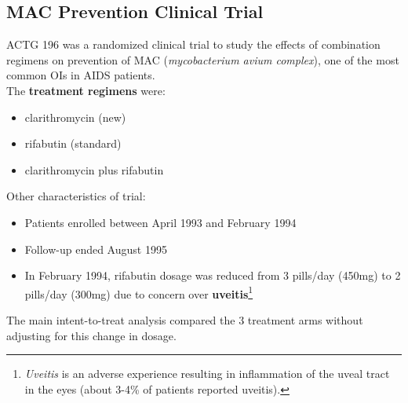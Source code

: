 \documentclass[11pt,slidesonly,semrot,portrait,palatino]{book}
\begin{document}
\subsection{MAC Prevention Clinical Trial}
ACTG 196 was a randomized clinical trial to study the effects of
combination regimens on prevention of MAC ({\em mycobacterium avium
complex}), one of the most common OIs in AIDS patients.\\[2ex]
\noindent
The {\bf treatment regimens} were:
\begin{itemize}
\item clarithromycin (new)
\item rifabutin (standard)
\item clarithromycin plus rifabutin
\end{itemize}
Other characteristics of trial:
\begin{itemize}
\item Patients enrolled between April 1993 and February 1994
\item Follow-up ended August 1995
\item In February 1994, rifabutin dosage was reduced from 3 pills/day
(450mg) to 2 pills/day (300mg) due to concern over {\bf uveitis}\footnote{\footnotesize
{\em Uveitis} is an adverse experience resulting in inflammation
of the uveal tract in the eyes (about 3-4\% of patients
reported uveitis).}
\end{itemize}
\noindent
The main intent-to-treat analysis compared the 3 treatment arms
without adjusting for this change in dosage.  \\[2ex]
\end{document}
